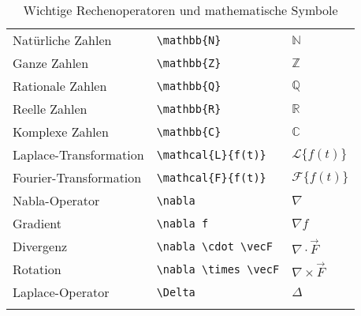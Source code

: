 \begin{longtable}{l l l}
    \midrule
    Natürliche Zahlen         & \texttt{\textbackslash mathbb\{N\}}                                                     & \( \mathbb{N} \)                     \\
    Ganze Zahlen              & \texttt{\textbackslash mathbb\{Z\}}                                                     & \( \mathbb{Z} \)                     \\
    Rationale Zahlen          & \texttt{\textbackslash mathbb\{Q\}}                                                     & \( \mathbb{Q} \)                     \\
    Reelle Zahlen             & \texttt{\textbackslash mathbb\{R\}}                                                     & \( \mathbb{R} \)                     \\
    Komplexe Zahlen           & \texttt{\textbackslash mathbb\{C\}}                                                     & \( \mathbb{C} \)                     \\

    \midrule
    Laplace-Transformation    & \texttt{\textbackslash mathcal\{L\}\{f(t)\}}                                            & \( \mathcal{L}\{f(t)\} \)            \\
    Fourier-Transformation    & \texttt{\textbackslash mathcal\{F\}\{f(t)\}}                                            & \( \mathcal{F}\{f(t)\} \)            \\
    Nabla-Operator            & \texttt{\textbackslash nabla}                                                           & \( \nabla \)                         \\
    Gradient                  & \texttt{\textbackslash nabla f}                                                         & \( \nabla f \)                       \\
    Divergenz                 & \texttt{\textbackslash nabla \textbackslash cdot \textbackslash vec{F}}                 & \( \nabla \cdot \vec{F} \)           \\
    Rotation                  & \texttt{\textbackslash nabla \textbackslash times \textbackslash vec{F}}                & \( \nabla \times \vec{F} \)          \\
    Laplace-Operator          & \texttt{\textbackslash Delta}                                                           & \( \Delta \)                         \\
    \caption{Wichtige Rechenoperatoren und mathematische Symbole} \label{tab:operatoren}
\end{longtable}
